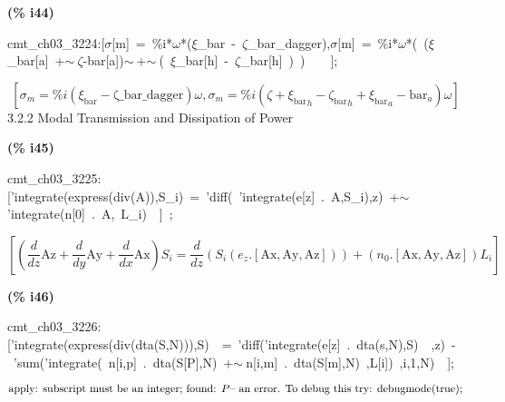 \documentclass[fleqn]{article}
\begin{document}
\noindent
\begin{minipage}[t]{4.000000em}\color{red}\bfseries
(\% i44)	
\end{minipage}
\begin{minipage}[t]{\textwidth}\color{blue}
cmt\_ch03\_3224:[\ensuremath{\sigma}[m]\ =\ \%i*\ensuremath{\omega}*(\ensuremath{\xi}\_bar\ -\ \ensuremath{\zeta}\_bar\_dagger),\ensuremath{\sigma}[m]\ =\ \%i*\ensuremath{\omega}*(\ (\ensuremath{\xi}\_bar[a]\ +\ensuremath{\sim\ }\ensuremath{\zeta}-bar[a])\ensuremath{\sim\ }+\ensuremath{\sim\ }(\ \ensuremath{\xi}\_bar[h]\ -\ \ensuremath{\zeta}\_bar[h]\ )\ )\ \ \ \ ];
\end{minipage}
\[\displaystyle \tag{cmt\_ ch03\_ 3224} 
\left[ {{\sigma }_m}=\% i \left( {{\xi }_{\ensuremath{\mathrm{bar}}}}-\ensuremath{\mathrm{\zeta \_ bar\_ dagger}}\right)  \omega \operatorname{,}{{\sigma }_m}=\% i \left( \zeta +{{{{\xi }_{\ensuremath{\mathrm{bar}}}}}_h}-{{{{\zeta }_{\ensuremath{\mathrm{bar}}}}}_h}+{{{{\xi }_{\ensuremath{\mathrm{bar}}}}}_a}-{{\ensuremath{\mathrm{bar}}}_a}\right)  \omega \right] \mbox{}
\]
3.2.2 Modal Transmission and Dissipation of Power


\noindent
\begin{minipage}[t]{4.000000em}\color{red}\bfseries
(\% i45)	
\end{minipage}
\begin{minipage}[t]{\textwidth}\color{blue}
cmt\_ch03\_3225:['integrate(express(div(A)),S\_i)\ =\ 'diff(\ 'integrate(e[z]\ .\ A,S\_i),z)\ +\ensuremath{\sim\ }'integrate(n[0]\ .\ A,\ L\_i)\ \ ]\ ;
\end{minipage}
\[\displaystyle \tag{cmt\_ ch03\_ 3225} 
\left[ \left( \frac{d}{d z} \ensuremath{\mathrm{Az}}+\frac{d}{d y} \ensuremath{\mathrm{Ay}}+\frac{d}{d x} \ensuremath{\mathrm{Ax}}\right)  {S_i}=\frac{d}{d z} \left( {S_i} \left( {e_z}\ensuremath{\mathrm{ . }}\left[ \ensuremath{\mathrm{Ax}}\operatorname{,}\ensuremath{\mathrm{Ay}}\operatorname{,}\ensuremath{\mathrm{Az}}\right] \right) \right) +\left( {n_0}\ensuremath{\mathrm{ . }}\left[ \ensuremath{\mathrm{Ax}}\operatorname{,}\ensuremath{\mathrm{Ay}}\operatorname{,}\ensuremath{\mathrm{Az}}\right] \right)  {L_i}\right] \mbox{}
\]


\noindent
\begin{minipage}[t]{4.000000em}\color{red}\bfseries
(\% i46)	
\end{minipage}
\begin{minipage}[t]{\textwidth}\color{blue}
cmt\_ch03\_3226:['integrate(express(div(dta(S,N))),S)\ \ =\ 'diff('integrate(e[z]\ .\ dta(s,N),S)\ \ ,z)\ -\ 'sum('integrate(\ n[i,p]\ .\ dta(S[P],N)\ +\ensuremath{\sim\ }n[i,m]\ .\ dta(S[m],N)\ ,L[i])\ ,i,1,N)\ \ ];
\end{minipage}
\[\displaystyle \mbox{}\\\mbox{%
apply: subscript must be an integer; found: }P
\mbox{%
 -- an error. To debug this try: debugmode(true);}\mbox{}
\]
\end{document}
